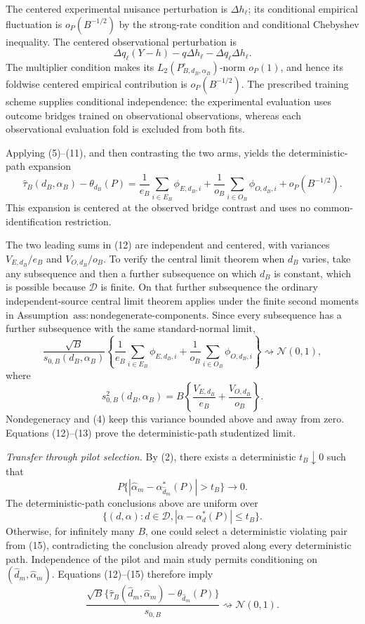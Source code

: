 The centered experimental nuisance perturbation is \(\Delta h_\ell\); its conditional empirical fluctuation is \(o_P(B^{-1/2})\) by the strong-rate condition and conditional Chebyshev inequality.  The centered observational perturbation is
\[
 \Delta q_\ell(Y-h)-q\Delta h_\ell-\Delta q_\ell\Delta h_\ell. \tag{11}
\]
The multiplier condition makes its \(L_2(P_{B,d_B,\alpha_B}^{\circ})\)-norm \(o_P(1)\), and hence its foldwise centered empirical contribution is \(o_P(B^{-1/2})\).  The prescribed training scheme supplies conditional independence: the experimental evaluation uses outcome bridges trained on observational observations, whereas each observational evaluation fold is excluded from both fits.

Applying (5)--(11), and then contrasting the two arms, yields the deterministic-path expansion
\[
 \widehat\tau_B(d_B,\alpha_B)-\theta_{d_B}(P)
 =\frac1{e_B}\sum_{i\in E_B}\phi_{E,d_B,i}
 +\frac1{o_B}\sum_{i\in O_B}\phi_{O,d_B,i}
 +o_P(B^{-1/2}).                                               \tag{12}
\]
This expansion is centered at the observed bridge contrast and uses no common-identification restriction.

The two leading sums in (12) are independent and centered, with variances \(V_{E,d_B}/e_B\) and \(V_{O,d_B}/o_B\).  To verify the central limit theorem when \(d_B\) varies, take any subsequence and then a further subsequence on which \(d_B\) is constant, which is possible because \(\mathcal D\) is finite.  On that further subsequence the ordinary independent-source central limit theorem applies under the finite second moments in Assumption~\(\mathrm{ass{:}nondegenerate\text{-}components}\).  Since every subsequence has a further subsequence with the same standard-normal limit,
\[
 \frac{\sqrt B}{s_{0,B}(d_B,\alpha_B)}
 \left\{
 \frac1{e_B}\sum_{i\in E_B}\phi_{E,d_B,i}
 +\frac1{o_B}\sum_{i\in O_B}\phi_{O,d_B,i}
 \right\}
 \rightsquigarrow\mathcal N(0,1),                             \tag{13}
\]
where
\[
 s_{0,B}^2(d_B,\alpha_B)
 =B\left\{\frac{V_{E,d_B}}{e_B}+\frac{V_{O,d_B}}{o_B}\right\}.
\]
Nondegeneracy and (4) keep this variance bounded above and away from zero.  Equations (12)--(13) prove the deterministic-path studentized limit.

\emph{Transfer through pilot selection.}
By (2), there exists a deterministic \(t_B\downarrow0\) such that
\[
 P\{|\widehat\alpha_m-\alpha_{\widehat d_m}^*(P)|>t_B\}
 \longrightarrow0.                                           \tag{14}
\]
The deterministic-path conclusions above are uniform over
\[
 \{(d,\alpha):d\in\mathcal D,
 |\alpha-\alpha_d^*(P)|\le t_B\}.                             \tag{15}
\]
Otherwise, for infinitely many \(B\), one could select a deterministic violating pair from (15), contradicting the conclusion already proved along every deterministic path.  Independence of the pilot and main study permits conditioning on \((\widehat d_m,\widehat\alpha_m)\).  Equations (12)--(15) therefore imply
\[
 \frac{\sqrt B\{\widehat\tau_B(\widehat d_m,\widehat\alpha_m)
 -\theta_{\widehat d_m}(P)\}}{s_{0,B}}
 \rightsquigarrow\mathcal N(0,1).                             \tag{16}
\]


